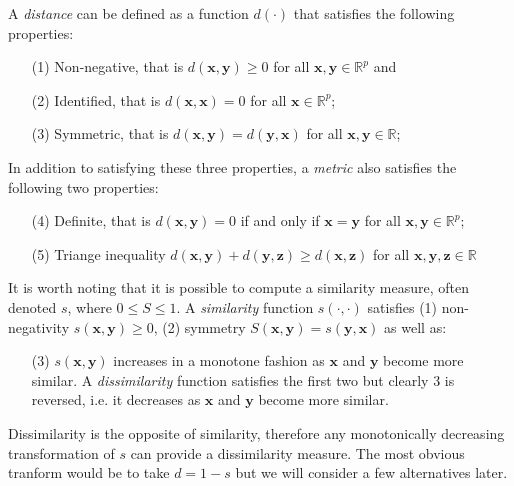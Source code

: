 A \emph{distance} can be defined as a function $d(\cdot)$ that satisfies the following properties:

\begin{itemize}
\item[(1)] Non-negative, that is $d(\boldsymbol{x},\boldsymbol{y}) \geq 0$ for all $\boldsymbol{x},\boldsymbol{y} \in \mathbb{R}^{p}$ and 
\item[(2)] Identified, that is $d(\boldsymbol{x},\boldsymbol{x}) = 0$ for all $\boldsymbol{x} \in \mathbb{R}^{p}$;
\item[(3)] Symmetric, that is $d(\boldsymbol{x},\boldsymbol{y}) = d(\boldsymbol{y},\boldsymbol{x})$ for all $\boldsymbol{x},\boldsymbol{y} \in \mathbb{R}$;
\end{itemize}

In addition to satisfying these three properties, a \emph{metric} also satisfies the following two properties:
\begin{itemize}
\item[(4)] Definite, that is $d(\boldsymbol{x},\boldsymbol{y}) = 0$ if and only if $\boldsymbol{x} = \boldsymbol{y}$ for all $\boldsymbol{x},\boldsymbol{y} \in \mathbb{R}^{p}$;
\item[(5)] Triange inequality $d(\boldsymbol{x},\boldsymbol{y}) + d(\boldsymbol{y},\boldsymbol{z}) \geq d(\boldsymbol{x},\boldsymbol{z})$ for all $\boldsymbol{x},\boldsymbol{y},\boldsymbol{z} \in \mathbb{R}$  
\end{itemize}


It is worth noting that it is possible to compute a similarity measure, often denoted $s$, where $0 \leq S \leq 1$.   A \emph{similarity} function $s(\cdot,\cdot)$ satisfies (1) non-negativity $s(\boldsymbol{x}, \boldsymbol{y}) \geq 0$, (2) symmetry $S(\boldsymbol{x},\boldsymbol{y}) = s(\boldsymbol{y},\boldsymbol{x})$ as well as:

\begin{itemize}
\item[(3)] $s(\boldsymbol{x}, \boldsymbol{y})$ increases in a monotone fashion as $\boldsymbol{x}$ and $\boldsymbol{y}$ become more similar.   A \emph{dissimilarity} function satisfies the first two but clearly 3 is reversed, i.e. it decreases as  $\boldsymbol{x}$ and $\boldsymbol{y}$ become more similar.  
\end{itemize}

Dissimilarity is the opposite of similarity, therefore any monotonically decreasing transformation of $s$ can provide a dissimilarity measure.   The most obvious tranform would be to take $d = 1 - s$ but we will consider a few alternatives later.

